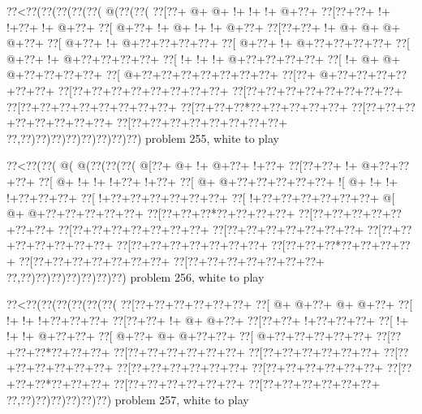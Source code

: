 \vbox{\vbox{\goo
\0??<\0??(\0??(\0??(\0??(\0??(\- @(\0??(\0??(
\0??[\0??+\- @+\- @+\- !+\- !+\- !+\- @+\0??+
\0??[\0??+\0??+\- !+\- !+\0??+\- !+\- @+\0??+
\0??[\- @+\0??+\- !+\- @+\- !+\- !+\- @+\0??+
\0??[\0??+\0??+\- !+\- @+\- @+\- @+\- @+\0??+
\0??[\- @+\0??+\- !+\- @+\0??+\0??+\0??+\0??+
\0??[\- @+\0??+\- !+\- @+\0??+\0??+\0??+\0??+
\0??[\- @+\0??+\- !+\- @+\0??+\0??+\0??+\0??+
\0??[\- !+\- !+\- !+\- @+\0??+\0??+\0??+\0??+
\0??[\- !+\- @+\- @+\- @+\0??+\0??+\0??+\0??+
\0??[\- @+\0??+\0??+\0??+\0??+\0??+\0??+\0??+
\0??[\0??+\- @+\0??+\0??+\0??+\0??+\0??+\0??+
\0??[\0??+\0??+\0??+\0??+\0??+\0??+\0??+\0??+
\0??[\0??+\0??+\0??+\0??+\0??+\0??+\0??+\0??+
\0??[\0??+\0??+\0??+\0??+\0??+\0??+\0??+\0??+
\0??[\0??+\0??+\0??*\0??+\0??+\0??+\0??+\0??+
\0??[\0??+\0??+\0??+\0??+\0??+\0??+\0??+\0??+
\0??[\0??+\0??+\0??+\0??+\0??+\0??+\0??+\0??+
\0??,\0??)\0??)\0??)\0??)\0??)\0??)\0??)\0??)
}
\hfil problem 255, white to play\hfil\break
}

\vbox{\vbox{\goo
\0??<\0??(\0??(\- @(\- @(\0??(\0??(\0??(
\- @[\0??+\- @+\- !+\- @+\0??+\- !+\0??+
\0??[\0??+\0??+\- !+\- @+\0??+\0??+\0??+
\0??[\- @+\- !+\- !+\- !+\0??+\- !+\0??+
\0??[\- @+\- @+\0??+\0??+\0??+\0??+\0??+
\- ![\- @+\- !+\- !+\- !+\0??+\0??+\0??+
\0??[\- !+\0??+\0??+\0??+\0??+\0??+\0??+
\0??[\- !+\0??+\0??+\0??+\0??+\0??+\0??+
\- @[\- @+\- @+\0??+\0??+\0??+\0??+\0??+
\0??[\0??+\0??+\0??*\0??+\0??+\0??+\0??+
\0??[\0??+\0??+\0??+\0??+\0??+\0??+\0??+
\0??[\0??+\0??+\0??+\0??+\0??+\0??+\0??+
\0??[\0??+\0??+\0??+\0??+\0??+\0??+\0??+
\0??[\0??+\0??+\0??+\0??+\0??+\0??+\0??+
\0??[\0??+\0??+\0??+\0??+\0??+\0??+\0??+
\0??[\0??+\0??+\0??*\0??+\0??+\0??+\0??+
\0??[\0??+\0??+\0??+\0??+\0??+\0??+\0??+
\0??[\0??+\0??+\0??+\0??+\0??+\0??+\0??+
\0??,\0??)\0??)\0??)\0??)\0??)\0??)\0??)
}
\hfil problem 256, white to play\hfil\break
}

\vbox{\vbox{\goo
\0??<\0??(\0??(\0??(\0??(\0??(\0??(
\0??[\0??+\0??+\0??+\0??+\0??+\0??+
\0??[\- @+\- @+\0??+\- @+\- @+\0??+
\0??[\- !+\- !+\- !+\0??+\0??+\0??+
\0??[\0??+\0??+\- !+\- @+\- @+\0??+
\0??[\0??+\0??+\- !+\0??+\0??+\0??+
\0??[\- !+\- !+\- !+\- @+\0??+\0??+
\0??[\- @+\0??+\- @+\- @+\0??+\0??+
\0??[\- @+\0??+\0??+\0??+\0??+\0??+
\0??[\0??+\0??+\0??*\0??+\0??+\0??+
\0??[\0??+\0??+\0??+\0??+\0??+\0??+
\0??[\0??+\0??+\0??+\0??+\0??+\0??+
\0??[\0??+\0??+\0??+\0??+\0??+\0??+
\0??[\0??+\0??+\0??+\0??+\0??+\0??+
\0??[\0??+\0??+\0??+\0??+\0??+\0??+
\0??[\0??+\0??+\0??*\0??+\0??+\0??+
\0??[\0??+\0??+\0??+\0??+\0??+\0??+
\0??[\0??+\0??+\0??+\0??+\0??+\0??+
\0??,\0??)\0??)\0??)\0??)\0??)\0??)
}
\hfil problem 257, white to play\hfil\break
}

